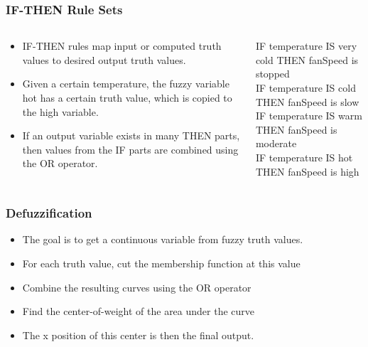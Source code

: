 \documentclass{beamer}
\begin{document}
   \begin{frame}
      \frametitle{IF-THEN Rule Sets}
      \begin{columns}[T]
         \begin{column}[T]{5cm}
            \begin{itemize}
               \item IF-THEN rules map input or computed truth values to desired output truth values.
               \item Given a certain temperature, the fuzzy variable hot has a certain truth value, which is copied to the high variable.
               \item If an output variable exists in many THEN parts, then values from the IF parts are combined using the OR operator.
            \end{itemize}
         \end{column}
         \begin{column}[T]{5cm}
            IF temperature IS very cold THEN fanSpeed is stopped \\
            IF temperature IS cold THEN fanSpeed is slow \\
            IF temperature IS warm THEN fanSpeed is moderate \\
            IF temperature IS hot THEN fanSpeed is high
         \end{column}
     \end{columns}
   \end{frame}

   \begin{frame}
      \frametitle{Defuzzification}
      \begin{itemize}
         \item The goal is to get a continuous variable from fuzzy truth values.
         \item For each truth value, cut the membership function at this value
         \item Combine the resulting curves using the OR operator
         \item Find the center-of-weight of the area under the curve
         \item The x position of this center is then the final output.
      \end{itemize}
   \end{frame}
\end{document}
